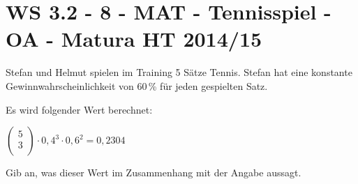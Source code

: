 \section{WS 3.2 - 8 - MAT - Tennisspiel - OA - Matura HT 2014/15}

\begin{beispiel}[WS 3.2]{1} %
Stefan und Helmut spielen im Training 5 Sätze Tennis. Stefan hat eine konstante Gewinnwahrscheinlichkeit von 60\,\% für jeden gespielten Satz.

Es wird folgender Wert berechnet:

$\begin{pmatrix}5 \\ 3 \\\end{pmatrix} \cdot 0,4^3 \cdot 0,6^2 =0,2304$ \leer

Gib an, was dieser Wert im Zusammenhang mit der Angabe aussagt.


\end{beispiel}